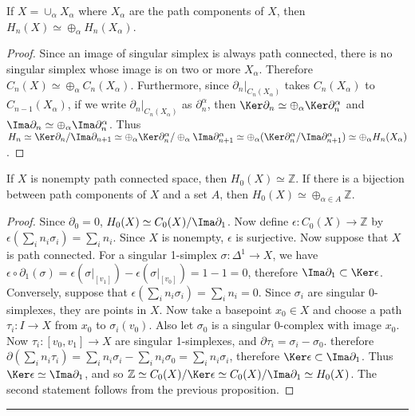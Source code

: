 \begin{prop} If $X=\cup_\alpha X_\alpha$ where $X_\alpha$ are the path components of $X$, then $H_n(X)\simeq \oplus_\alpha H_n(X_\alpha)$.
\end{prop}
\begin{proof} Since an image of singular simplex is always path connected, there is no singular simplex whose image is on two or more $X_\alpha$. Therefore $C_n(X)\simeq \oplus_\alpha C_n(X_\alpha)$. Furthermore, since $\partial_n|_{C_{n}(X_\alpha)}$ takes $C_{n}(X_\alpha)$ to $C_{n-1}(X_\alpha)$, if we write $\partial_n|_{C_{n}(X_\alpha)}$ as $\partial_n^\alpha$, then $\Ker\partial_n\simeq \oplus_\alpha \Ker\partial_n^\alpha$ and $\Ima\partial_n\simeq \oplus_\alpha \Ima\partial_n^\alpha$. Thus $H_n\simeq \Ker\partial_n/\Ima\partial_{n+1}\simeq \oplus_\alpha \Ker\partial_n^\alpha/\oplus_\alpha \Ima\partial_{n+1}^\alpha\simeq \oplus_\alpha(\Ker\partial_n^\alpha/\Ima\partial_{n+1}^\alpha)\simeq \oplus_\alpha H_n(X_\alpha)$.
\end{proof}
\begin{prop} If $X$ is nonempty path connected space, then $H_0(X)\simeq \mathbb{Z}$. If there is a bijection between path components of $X$ and a set $A$, then $H_0(X)\simeq \oplus_{\alpha\in A}\mathbb{Z}$.
\end{prop}
\begin{proof}
Since $\partial_0=0$, $H_0(X)\simeq C_0(X)/\Ima\partial_1$. Now define $\epsilon:C_0(X)\rightarrow\mathbb{Z}$ by $\epsilon(\sum_in_i\sigma_i)=\sum_i n_i$. Since $X$ is nonempty, $\epsilon$ is surjective. Now suppose that $X$ is path connected. For a singular 1-simplex $\sigma:\Delta^1\rightarrow X$, we have $\epsilon\circ\partial_1(\sigma)=\epsilon(\sigma|_{[v_1]})-\epsilon(\sigma|_{[v_0]})=1-1=0$, therefore $\Ima\partial_1\subset \Ker\epsilon$. Conversely, suppose that $\epsilon(\sum_in_i\sigma_i)=\sum_in_i=0$. Since $\sigma_i$ are singular 0-simplexes, they are points in $X$. Now take a basepoint $x_0\in X$ and choose a path $\tau_i:I\rightarrow X$ from $x_0$ to $\sigma_i(v_0)$. Also let $\sigma_0$ is a singular 0-complex with image $x_0$. Now $\tau_i:[v_0,v_1]\rightarrow X$ are singular 1-simplexes, and $\partial\tau_i=\sigma_i-\sigma_0$. therefore $\partial(\sum_i n_i\tau_i)=\sum_in_i\sigma_i-\sum_in_i\sigma_0=\sum_in_i\sigma_i$, therefore $\Ker\epsilon\subset\Ima\partial_1$. Thus $\Ker\epsilon\simeq\Ima\partial_1$, and so $\mathbb{Z}\simeq C_0(X)/\Ker\epsilon\simeq C_0(X)/\Ima\partial_1\simeq H_0(X)$. The second statement follows from the previous proposition.
\end{proof}
\noindent\rule{\textwidth}{1pt}
\newline